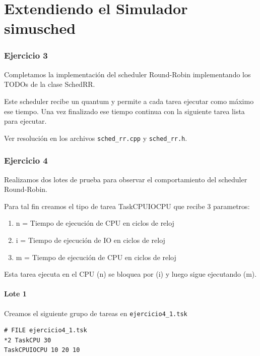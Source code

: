


\part{Extendiendo el Simulador simusched}

\section{Ejercicio 3}

Completamos la implementaci\'on del scheduler Round-Robin implementando los TODOs de la clase SchedRR.

Este scheduler recibe un quantum y permite a cada tarea ejecutar como m\'aximo ese tiempo. Una vez finalizado ese tiempo continua con la siguiente tarea lista para ejecutar.

Ver resoluci\'on en los archivos \verb|sched_rr.cpp| y \verb|sched_rr.h|.

\section{Ejercicio 4}

Realizamos dos lotes de prueba para observar el comportamiento del scheduler Round-Robin.

Para tal fin creamos el tipo de tarea TaskCPUIOCPU que recibe 3 parametros:

\begin{enumerate}
 \item n = Tiempo de ejecuci\'on de CPU en ciclos de reloj
 \item i = Tiempo de ejecuci\'on de IO en ciclos de reloj
 \item m = Tiempo de ejecuci\'on de CPU en ciclos de reloj
\end{enumerate}

Esta tarea ejecuta en el CPU (n) se bloquea por (i) y luego sigue ejecutando (m).

\subsection{Lote 1}

Creamos el siguiente grupo de tareas en \verb|ejercicio4_1.tsk|

\begin{framed}
\begin{verbatim}
# FILE ejercicio4_1.tsk
*2 TaskCPU 30
TaskCPUIOCPU 10 20 10
\end{verbatim}
\end{framed}

